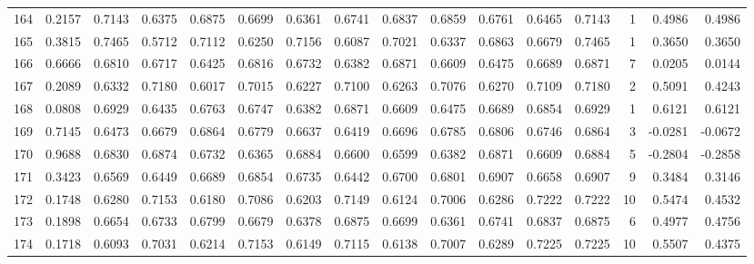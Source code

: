 \begin{tabular}{lrrrrrrrrrrrrrrr}
164 &      0.2157 &  0.7143 &  0.6375 &  0.6875 &  0.6699 &  0.6361 &  0.6741 &  0.6837 &  0.6859 &  0.6761 &   0.6465 &     0.7143 &      1 &                    0.4986 &                     0.4986 \\
165 &      0.3815 &  0.7465 &  0.5712 &  0.7112 &  0.6250 &  0.7156 &  0.6087 &  0.7021 &  0.6337 &  0.6863 &   0.6679 &     0.7465 &      1 &                    0.3650 &                     0.3650 \\
166 &      0.6666 &  0.6810 &  0.6717 &  0.6425 &  0.6816 &  0.6732 &  0.6382 &  0.6871 &  0.6609 &  0.6475 &   0.6689 &     0.6871 &      7 &                    0.0205 &                     0.0144 \\
167 &      0.2089 &  0.6332 &  0.7180 &  0.6017 &  0.7015 &  0.6227 &  0.7100 &  0.6263 &  0.7076 &  0.6270 &   0.7109 &     0.7180 &      2 &                    0.5091 &                     0.4243 \\
168 &      0.0808 &  0.6929 &  0.6435 &  0.6763 &  0.6747 &  0.6382 &  0.6871 &  0.6609 &  0.6475 &  0.6689 &   0.6854 &     0.6929 &      1 &                    0.6121 &                     0.6121 \\
169 &      0.7145 &  0.6473 &  0.6679 &  0.6864 &  0.6779 &  0.6637 &  0.6419 &  0.6696 &  0.6785 &  0.6806 &   0.6746 &     0.6864 &      3 &                   -0.0281 &                    -0.0672 \\
170 &      0.9688 &  0.6830 &  0.6874 &  0.6732 &  0.6365 &  0.6884 &  0.6600 &  0.6599 &  0.6382 &  0.6871 &   0.6609 &     0.6884 &      5 &                   -0.2804 &                    -0.2858 \\
171 &      0.3423 &  0.6569 &  0.6449 &  0.6689 &  0.6854 &  0.6735 &  0.6442 &  0.6700 &  0.6801 &  0.6907 &   0.6658 &     0.6907 &      9 &                    0.3484 &                     0.3146 \\
172 &      0.1748 &  0.6280 &  0.7153 &  0.6180 &  0.7086 &  0.6203 &  0.7149 &  0.6124 &  0.7006 &  0.6286 &   0.7222 &     0.7222 &     10 &                    0.5474 &                     0.4532 \\
173 &      0.1898 &  0.6654 &  0.6733 &  0.6799 &  0.6679 &  0.6378 &  0.6875 &  0.6699 &  0.6361 &  0.6741 &   0.6837 &     0.6875 &      6 &                    0.4977 &                     0.4756 \\
174 &      0.1718 &  0.6093 &  0.7031 &  0.6214 &  0.7153 &  0.6149 &  0.7115 &  0.6138 &  0.7007 &  0.6289 &   0.7225 &     0.7225 &     10 &                    0.5507 &                     0.4375 \\

\end{tabular}

